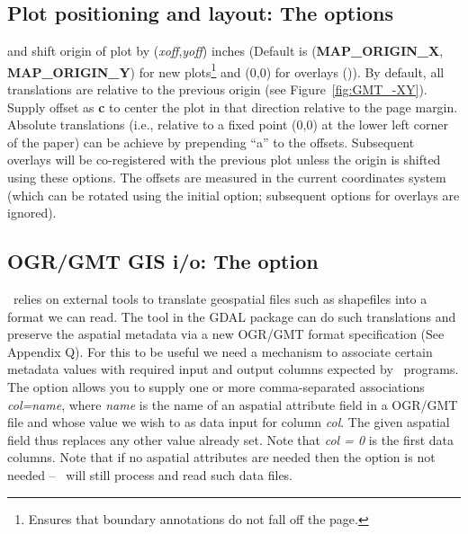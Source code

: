 \subsection{Plot positioning and layout: The   options}

 and  shift origin of plot by (\emph{xoff},\emph{yoff})
inches (Default is (\textbf{MAP\_ORIGIN\_X}, \textbf{MAP\_ORIGIN\_Y}) for new plots\footnote{Ensures that
boundary annotations do not fall off the page.} and (0,0) for overlays ()).
By default, all translations are relative to the previous origin
(see Figure~\ref{fig:GMT_-XY}).  Supply offset as \textbf{c} to center the
plot in that direction relative to the page margin.
Absolute translations (i.e., relative to a fixed point (0,0) at the
lower left corner of the paper) can be achieve by prepending ``a''
to the offsets.  Subsequent overlays will be co-registered with the
previous plot unless the origin is shifted using these options.
The offsets are measured in the current coordinates system (which can
be rotated using the initial  option; subsequent  options
for overlays are ignored).

\subsection{OGR/GMT GIS i/o: The  option}

\GMT\ relies on external tools to translate geospatial files such as shapefiles
into a format we can read.  The tool  in the GDAL package can do such
translations and preserve the aspatial metadata via a new OGR/GMT format
specification (See Appendix Q).  For this to be useful we need a mechanism
to associate certain metadata values with required input and output columns expected
by \GMT\ programs.  The  option allows you to supply one or more
comma-separated associations \emph{col=name}, where
\emph{name} is the name of an aspatial attribute field in a OGR/GMT file
and whose value we wish to as data input for column \emph{col}.  The
given aspatial field thus replaces any other value already set.  Note
that \emph{col = 0} is the first data columns.  Note that if no aspatial attributes
are needed then the  option is not needed -- \GMT\ will still process
and read such data files.

